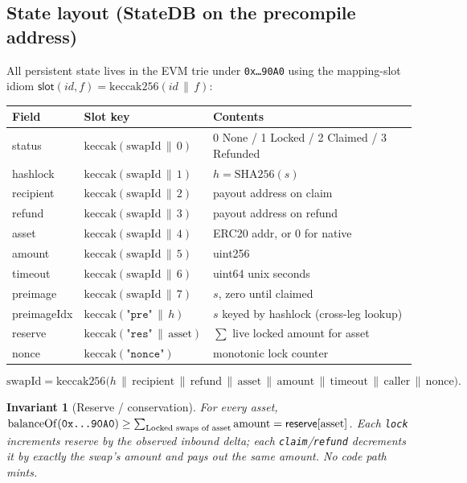 \documentclass[11pt]{article}
\newtheorem{invariant}{Invariant}
\begin{document}
\subsection{State layout (StateDB on the precompile address)}
All persistent state lives in the EVM trie under \texttt{0x{\dots}90A0} using the
mapping-slot idiom $\textsf{slot}(id,f)=\mathrm{keccak256}(id \,\|\, f)$:
\begin{center}
\begin{tabular}{@{}lll@{}}
\toprule
Field & Slot key & Contents \\
\midrule
status      & $\mathrm{keccak}(\text{swapId}\,\|\,0)$ & 0 None / 1 Locked / 2 Claimed / 3 Refunded \\
hashlock    & $\mathrm{keccak}(\text{swapId}\,\|\,1)$ & $h=\mathrm{SHA256}(s)$ \\
recipient   & $\mathrm{keccak}(\text{swapId}\,\|\,2)$ & payout address on claim \\
refund      & $\mathrm{keccak}(\text{swapId}\,\|\,3)$ & payout address on refund \\
asset       & $\mathrm{keccak}(\text{swapId}\,\|\,4)$ & ERC20 addr, or $0$ for native \\
amount      & $\mathrm{keccak}(\text{swapId}\,\|\,5)$ & uint256 \\
timeout     & $\mathrm{keccak}(\text{swapId}\,\|\,6)$ & uint64 unix seconds \\
preimage    & $\mathrm{keccak}(\text{swapId}\,\|\,7)$ & $s$, zero until claimed \\
preimageIdx & $\mathrm{keccak}(\texttt{"pre"}\,\|\,h)$ & $s$ keyed by hashlock (cross-leg lookup) \\
reserve     & $\mathrm{keccak}(\texttt{"res"}\,\|\,\text{asset})$ & $\sum$ live locked amount for asset \\
nonce       & $\mathrm{keccak}(\texttt{"nonce"})$ & monotonic lock counter \\
\bottomrule
\end{tabular}
\end{center}
\[
  \text{swapId}=\mathrm{keccak256}\big(h \,\|\, \text{recipient} \,\|\,
  \text{refund} \,\|\, \text{asset} \,\|\, \text{amount} \,\|\, \text{timeout}
  \,\|\, \text{caller} \,\|\, \text{nonce}\big).
\]

\begin{invariant}[Reserve / conservation]
\label{inv:res}
For every asset, $\mathrm{balanceOf}(\texttt{0x{\dots}90A0}) \ge
\sum_{\text{Locked swaps of asset}} \text{amount} = \textsf{reserve}[\text{asset}]$.
Each \texttt{lock} increments \textsf{reserve} by the \emph{observed} inbound
delta; each \texttt{claim}/\texttt{refund} decrements it by exactly the swap's
amount and pays out the same amount. No code path mints.
\end{invariant}
\end{document}
